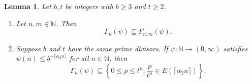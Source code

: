 \documentclass[10pt,a4paper]{amsart}
\newtheorem{lemma}{Lemma}
\begin{document}
\begin{lemma}\label{30} 
Let $b,t$ be integers with $b\geq3$ and $t\geq2$.
\begin{enumerate}
\item[(i)] Let $n,m\in\mathbb{N}$.  
Then  
$$\Gamma_{n}(\psi)\subseteq F_{n,m}(\psi).$$
\item[(ii)] Suppose $b$ and $t$ have the same prime divisors.  If $\psi:\mathbb{N}\to(0,\infty)$ satisfies $\psi(n)\leq b^{-\lceil\alpha_{2}n\rceil}$ for all $n\in\mathbb{N}$, then  
\begin{equation}\label{svweakform} \Gamma_{n}(\psi)\subseteq\left\{0\leq p\leq t^{n}:\frac{p}{t^{n}}\in E (\lceil\alpha_{2}n\rceil )\right\}.   \end{equation}
\end{enumerate}
\end{lemma}
\end{document}
